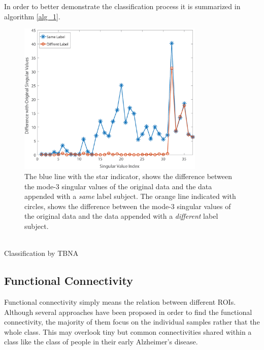 \documentclass[journal]{IEEEtran}
\begin{document}
	In order to better demonstrate the classification process
	it is summarized in algorithm \eqref{alg_1}.
	
	\begin{figure}[!t]
		\centering
		\includegraphics[width=3.5in]{SVDiff}
		
		\caption{The blue line with the star indicator, shows the difference between the mode-$3$ singular values of the original data and the data appended with a \emph{same} label subject. The orange line indicated with circles, shows the difference between the mode-$3$ singular values of the original data and the data appended with a \emph{different} label subject.}
		\label{g3.1}
	\end{figure}
	
	
	\begin{algorithm} 
		\label{alg_1}
		\SetAlgoLined
		\\
		\caption{Classification by TBNA}
		\vspace{3mm}
	\end{algorithm} 
	
	
	
	\subsection{Functional Connectivity} \label{FC_Construction}
	Functional connectivity simply means the relation between different ROIs. Although several approaches have been proposed in order to find the functional connectivity, the majority of them focus on the individual samples rather that the whole class. This may overlook tiny but common connectivities shared within a class like the class of people in their early Alzheimer's disease.  
	
\end{document}
